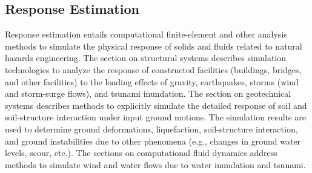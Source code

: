 
\begin{partbacktext}
\part{Response Estimation}
\label{part:response}

Response estimation entails computational finite-element and other analysis methods to simulate the physical response of solids and fluids related to natural hazards engineering. The section on structural systems describes simulation technologies to analyze the response of constructed facilities (buildings, bridges, and other facilities) to the loading effects of gravity, earthquakes, storms (wind and storm-surge flows), and tsunami inundation. The section on geotechnical systems describes methods to explicitly simulate the detailed response of soil and soil-structure interaction under input ground motions. The simulation results are used to determine ground deformations, liquefaction, soil-structure interaction, and ground instabilities due to other phenomena (e.g., changes in ground water levels, scour, etc.). The sections on computational fluid dynamics address methods to simulate wind and water flows due to water inundation and tsunami. 

\end{partbacktext}